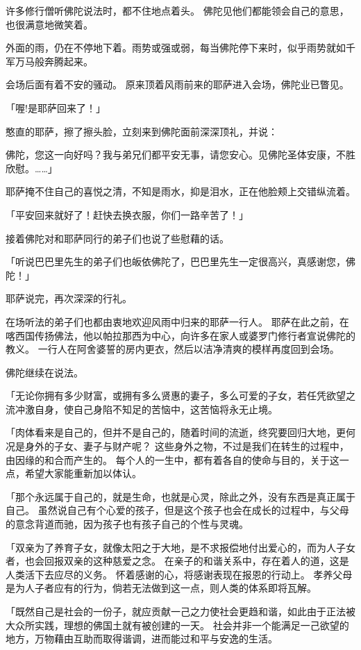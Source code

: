 \documentclass[twoside,openany]{book}
\begin{document}
许多修行僧听佛陀说法时，都不住地点着头。
佛陀见他们都能领会自己的意思，也很满意地微笑着。

外面的雨，仍在不停地下着。雨势或强或弱，每当佛陀停下来时，似乎雨势就如千军万马般奔腾起来。

会场后面有着不安的骚动。
原来顶着风雨前来的耶萨进入会场，佛陀业已瞥见。

「喔!是耶萨回来了！」

憨直的耶萨，擦了擦头脸，立刻来到佛陀面前深深顶礼，并说：

佛陀，您这一向好吗？我与弟兄们都平安无事，请您安心。见佛陀圣体安康，不胜欣慰。……」

耶萨掩不住自己的喜悦之清，不知是雨水，抑是泪水，正在他脸颊上交错纵流着。

「平安回来就好了！赶快去换衣服，你们一路辛苦了！」

接着佛陀对和耶萨同行的弟子们也说了些慰藉的话。

「听说巴巴里先生的弟子们也皈依佛陀了，巴巴里先生一定很高兴，真感谢您，佛陀！」

耶萨说完，再次深深的行礼。

在场听法的弟子们也都由衷地欢迎风雨中归来的耶萨一行人。
耶萨在此之前，在喀西国传扬佛法，他以帕拉那西为中心，向许多在家人或婆罗门修行者宣说佛陀的教义。
一行人在阿舍婆誓的房内更衣，然后以洁净清爽的模样再度回到会场。

佛陀继续在说法。

「无论你拥有多少财富，或拥有多么贤惠的妻子，多么可爱的子女，若任凭欲望之流冲激自身，使自己身陷不知足的苦恼中，这苦恼将永无止境。

「肉体看来是自己的，但并不是自己的，随着时间的流逝，终究要回归大地，更何况是身外的子女、妻子与财产呢？
这些身外之物，不过是我们在转生的过程中，由因缘的和合而产生的。
每个人的一生中，都有着各自的使命与目的，关于这一点，希望大家能重新加以体认。

「那个永远属于自己的，就是生命，也就是心灵，除此之外，没有东西是真正属于自己。
虽然说自己有个心爱的孩子，但是这个孩子也会在成长的过程中，与父母的意念背道而驰，因为孩子也有孩子自己的个性与灵魂。

「双亲为了养育子女，就像太阳之于大地，是不求报偿地付出爱心的，而为人子女者，也会回报双亲的这种慈爱之念。
在亲子的和谐关系中，存在着人的道，这是人类活下去应尽的义务。
怀着感谢的心，将感谢表现在报恩的行动上。
孝养父母是为人子者应有的行为，倘若无法做到这一点，则人类的体系即将瓦解。

「既然自己是社会的一份子，就应贡献一己之力使社会更趋和谐，如此由于正法被大众所实践，理想的佛国土就有被创建的一天。
社会并非一个能满足一己欲望的地方，万物藉由互助而取得谐调，进而能过和平与安逸的生活。
\end{document}
